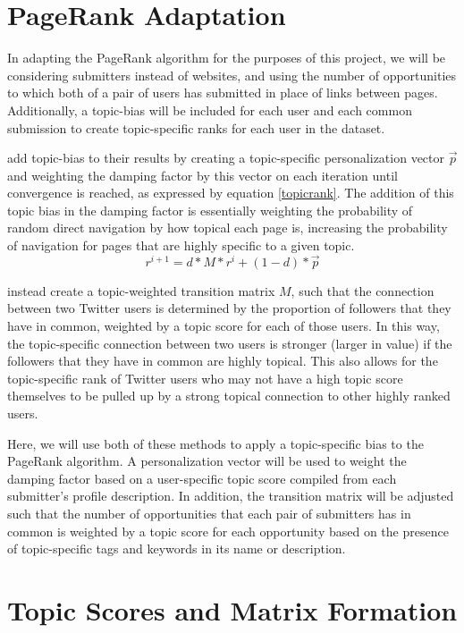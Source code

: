 \documentclass[]{report}   %
\begin{document}
\section{PageRank Adaptation}

In adapting the PageRank algorithm for the purposes of this project, we will be considering submitters instead of websites, and using the number of opportunities to which both of a pair of users has submitted in place of links between pages. Additionally, a topic-bias will be included for each user and each common submission to create topic-specific ranks for each user in the dataset.

 add topic-bias to their results by creating a topic-specific personalization vector $\vec{p}$ and weighting the damping factor by this vector on each iteration until convergence is reached, as expressed by equation \ref{topicrank}. The addition of this topic bias in the damping factor is essentially weighting the probability of random direct navigation by how topical each page is, increasing the probability of navigation for pages that are highly specific to a given topic. 
\begin{equation}
\label{topicrank}
 r^{i+1}=d*M*r^{i}+(1-d)*\vec{p}
\end{equation}

 instead create a topic-weighted transition matrix $M$, such that the connection between two Twitter users is determined by the proportion of followers that they have in common, weighted by a topic score for each of those users. In this way, the topic-specific connection between two users is stronger (larger in value) if the followers that they have in common are highly topical. This also allows for the topic-specific rank of Twitter users who may not have a high topic score themselves to be pulled up by a strong topical connection to other highly ranked users.

Here, we will use both of these methods to apply a topic-specific bias to the PageRank algorithm. A personalization vector will be used to weight the damping factor based on a user-specific topic score compiled from each submitter's profile description. In addition, the transition matrix will be adjusted such that the number of opportunities that each pair of submitters has in common is weighted by a topic score for each opportunity based on the presence of topic-specific tags and keywords in its name or description.

\section{Topic Scores and Matrix Formation}
\end{document}
